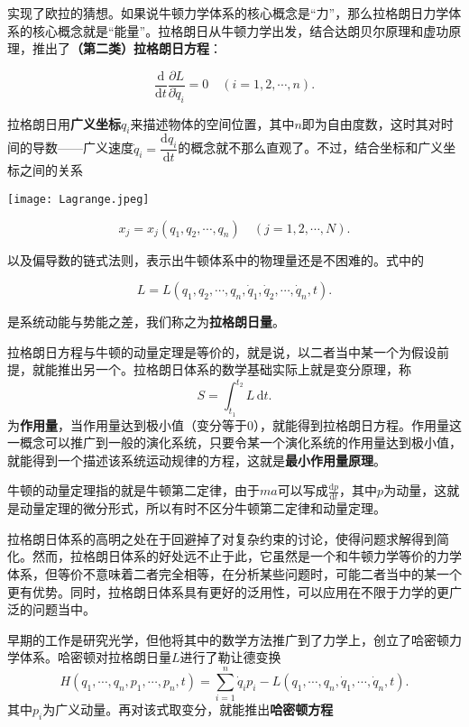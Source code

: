实现了欧拉的猜想。如果说牛顿力学体系的核心概念是“力”，那么拉格朗日力学体系的核心概念就是“能量”。拉格朗日从牛顿力学出发，结合达朗贝尔原理和虚功原理，推出了\textbf{（第二类）拉格朗日方程}：

\[
    \frac{\mathrm{d}}{\mathrm{d}t}\frac{\partial L}{\partial \dot{q}_i}=0 \quad (i=1,2,\cdots,n)
    .\]

拉格朗日用\textbf{广义坐标}$q_i$来描述物体的空间位置，其中$n$即为自由度数，这时其对时间的导数——广义速度$\dot{q}_i=\dfrac{\mathrm{d} q_i}{\mathrm{d} t}$的概念就不那么直观了。不过，结合坐标和广义坐标之间的关系

\begin{marginparfigure}
    \texttt{[image: Lagrange.jpeg]}
\end{marginparfigure}

\[
    x_j=x_j\left(q_1, q_2, \cdots, q_n\right) \quad \left(j=1, 2, \cdots, N\right)
    .\]

以及偏导数的链式法则，表示出牛顿体系中的物理量还是不困难的。式中的

\[
    L=L(q_1,q_2,\cdots,q_n,\dot{q}_1,\dot{q}_2,\cdots,\dot{q}_n,t)
    .\]

是系统动能与势能之差，我们称之为\textbf{拉格朗日量}。

拉格朗日方程与牛顿的动量定理是等价的，就是说，以二者当中某一个为假设前提，就能推出另一个。拉格朗日体系的数学基础实际上就是变分原理，称
\[
    S=\int_{t_1}^{t_2}{L\,\mathrm{d}t}
    .\]
为\textbf{作用量}，当作用量达到极小值（变分等于$0$），就能得到拉格朗日方程。作用量这一概念可以推广到一般的演化系统，只要令某一个演化系统的作用量达到极小值，就能得到一个描述该系统运动规律的方程，这就是\textbf{最小作用量原理}。
\begin{marginpartext}
        牛顿的动量定理指的就是牛顿第二定律，由于$ma$可以写成$\frac{\mathrm{d}p}{\mathrm{d}t}$，其中$p$为动量，这就是动量定理的微分形式，所以有时不区分牛顿第二定律和动量定理。
\end{marginpartext}

拉格朗日体系的高明之处在于回避掉了对复杂约束的讨论，使得问题求解得到简化。然而，拉格朗日体系的好处远不止于此，它虽然是一个和牛顿力学等价的力学体系，但等价不意味着二者完全相等，在分析某些问题时，可能二者当中的某一个更有优势。同时，拉格朗日体系具有更好的泛用性，可以应用在不限于力学的更广泛的问题当中。

早期的工作是研究光学，但他将其中的数学方法推广到了力学上，创立了哈密顿力学体系。哈密顿对拉格朗日量$L$进行了勒让德变换
\[
    H\left(q_1,\cdots,q_n,p_1,\cdots,p_n,t\right)=\sum_{i=1}^n{\dot{q}_ip_i}-L\left( q_1,\cdots ,q_n,\dot{q}_1,\cdots ,\dot{q}_n,t \right)
    .\]
其中$p_i$为广义动量。再对该式取变分，就能推出\textbf{哈密顿方程}

